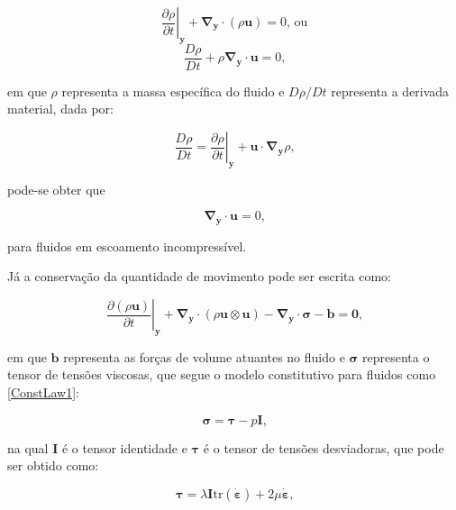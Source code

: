 \documentclass[_ArquivoPrincipal.tex]{subfiles}
\begin{document}
\begin{equation}
    \left.\frac{\partial\rho}{\partial t}\right|_{\mathbf{y}}+\mathbf{\nabla}_\mathbf{y}\cdot(\rho\mathbf{u})=0\text{, ou}
    \label{ConMas1}
\end{equation}
\begin{equation}
    \frac{D\rho}{Dt}+\rho\mathbf{\nabla}_\mathbf{y}\cdot\mathbf{u}=0\text{,}
    \label{ConMas2}
\end{equation}

\noindent em que $\rho$ representa a massa específica do fluido e $D\rho/Dt$ representa a derivada material, dada por:

\begin{equation}
    \frac{D\rho}{Dt}=\left.\frac{\partial\rho}{\partial t}\right|_\mathbf{y}+\mathbf{u}\cdot\mathbf{\nabla}_\mathbf{y}\rho\text{,}
    \label{DerMat}
\end{equation}

\noindent pode-se obter que 

\begin{equation}
    \mathbf{\nabla}_\mathbf{y}\cdot\mathbf{u}=0\text{,}
    \label{Divu0}
\end{equation}

\noindent para fluidos em escoamento incompressível.

Já a conservação da quantidade de movimento pode ser escrita como:

\begin{equation}
    \left.\frac{\partial(\rho\mathbf{u})}{\partial t}\right|_\mathbf{y}+\mathbf{\nabla}_\mathbf{y}\cdot(\rho\mathbf{u}\otimes\mathbf{u})-\mathbf{\nabla}_\mathbf{y}\cdot\mathbf{\sigma}-\mathbf{b}=\mathbf{0}\text{,}
    \label{ConQuantMov}
\end{equation}

\noindent em que $\mathbf{b}$ representa as forças de volume atuantes no fluido e $\mathbf{\sigma}$ representa o tensor de tensões viscosas, que segue o modelo constitutivo para fluidos como \ref{ConstLaw1}:

\begin{equation}
    \mathbf{\sigma}=\mathbf{\tau}-p\mathbf{I}\text{,}
    \label{ConstLaw1}
\end{equation}

\noindent na qual $\mathbf{I}$ é o tensor identidade e $\mathbf{\tau}$ é o tensor de tensões desviadoras, que pode ser obtido como:

\begin{equation}
    \mathbf{\tau}=\lambda\mathbf{I}\textrm{tr}(\dot{\mathbf{\varepsilon}})+2\mu\dot{\mathbf{\varepsilon}}\text{,}
    \label{TensDesv}
\end{equation}
\end{document}
